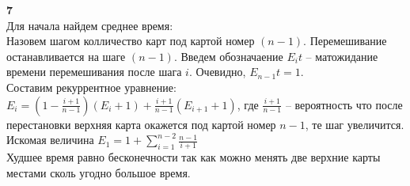 \documentclass[a4paper,12pt]{article}
\begin{document}
\large\textbf{7}\normalsize\\
Для начала найдем среднее время: \\
Назовем шагом колличество карт под картой номер $(n-1)$. Перемешивание останавливается на шаге $(n-1)$. Введем обозначаение 
$E_{i}t$ -- матожидание времени перемешивания после шага $i$. Очевидно, $E_{n-1}t = 1$.\\ Составим рекуррентное уравнение:\\
$E_{i} = (1-\frac{i+1}{n-1})(E_{i} + 1) + \frac{i+1}{n-1}(E_{i+1} + 1)$, где $\frac{i+1}{n-1}$ -- вероятность что после перестановки верхняя карта окажется под картой номер $n-1$, те шаг увеличится. Искомая величина $E_{1} = 1 + \sum_{i=1}^{n-2} \frac{n-1}{i+1}$\\ 
Худшее время равно бесконечности так как можно менять две верхние карты местами сколь угодно большое время.
\end{document}
